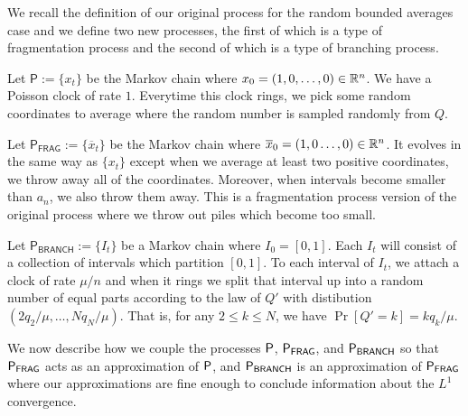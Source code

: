 \documentclass[12pt]{article}
\begin{document}
We recall the definition of our original process for the random bounded averages case and we define two new processes, the first of which is a type of fragmentation process and the second of which is a type of branching process. 

\begin{defn} 
	Let $\mathsf{P} := \{x_t\}$ be the Markov chain where $x_0 = (1, 0, \ldots, 0) \in \mathbb{R}^n$. We have a Poisson clock of rate $1$. Everytime this clock rings, we pick some random coordinates to average where the random number is sampled randomly from $Q$. 
\end{defn}

\begin{defn} 
	Let $\mathsf{P}_{\mathsf{FRAG}} := \{\overline{x}_t\}$ be the Markov chain where $\overline{x}_0 = (1, 0 \ldots, 0) \in \mathbb{R}^n$. It evolves in the same way as $\{x_t\}$ except when we average at least two positive coordinates, we throw away all of the coordinates. Moreover, when intervals become smaller than $a_n$, we also throw them away. This is a fragmentation process version of the original process where we throw out piles which become too small. 
\end{defn}

\begin{defn}  \label{branching-definition}
	Let $\mathsf{P}_{\mathsf{BRANCH}} := \{I_t\}$ be a Markov chain where $I_0 = [0, 1]$. Each $I_t$ will consist of a collection of intervals which partition $[0, 1]$. To each interval of $I_t$, we attach a clock of rate $\mu / n$ and when it rings we split that interval up into a random number of equal parts according to the law of $Q'$ with distibution $(2q_2 / \mu, \ldots, Nq_N /\mu)$. That is, for any $2 \leq k \leq N$, we have $\Pr[Q' = k] = kq_k/\mu$. 
\end{defn}

We now describe how we couple the processes $\mathsf{P}$, $\mathsf{P}_{\mathsf{FRAG}}$, and $\mathsf{P}_{\mathsf{BRANCH}}$ so that $\mathsf{P}_{\mathsf{FRAG}}$ acts as an approximation of $\mathsf{P}$, and $\mathsf{P}_{\mathsf{BRANCH}}$ is an approximation of $\mathsf{P}_{\mathsf{FRAG}}$ where our approximations are fine enough to conclude information about the $L^1$ convergence. 
\end{document}
